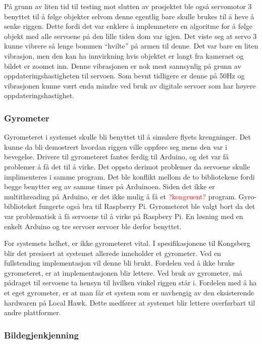 På grunn av liten tid til testing mot slutten av prosjektet ble også servomotor 3 benyttet til å følge objekter selvom denne egentlig bare skulle brukes til å heve å senke riggen. Dette fordi det var enklere å implemnetere en algoritme for å følge objekt med alle servoene på den lille tiden dom var igjen. Det viste seg at servo 3 kunne vibrere så lenge bommen ``hvilte'' på armen til denne. Det var bare en liten vibrasjon, men den kan ha innvirkning hvis objektet er langt fra kameraet og bildet er zoomet inn. Denne vibrasjonen er nok mest sannsynlig på grunn av oppdateringshastigheten til servoen. Som bevnt tidligere er denne på 50Hz og vibrasjonen kunne vært enda mindre ved bruk av digitale servoer som har høyere oppdateringshastighet.  
   

\subsubsection{Gyrometer}
Gyrometeret i systemet skulle bli benyttet til å simulere flyets krengninger. Det kunne da bli demostrert hvordan riggen ville oppføre seg mens den var i bevegelse. Drivere til gyrometeret fantes ferdig til Arduino, og det var få problemer å få det til å virke. Det oppsto derimot problemer da servoene skulle implimenteres i samme program. Det ble konflikt mellom de to bibliotekene fordi begge benytter seg av samme timer på Arduinoen. Siden det ikke er multithreading på Arduino, er det ikke mulig å få et \textcolor{red}{?kongruent?} program. Gyro-biblioteket fungerte også bra til Raspberry Pi. Gyrometeret ble valgt bort da det var problematisk å få servoene til å virke på Raspbery Pi. En løsning med en enkelt Arduino og tre servoer servoer ble derfor benyttet. 

For systemets helhet, er ikke gyrometeret vital. I spesifikasjonene til Kongsberg blir det presisert at systemet allerede inneholder et gyrometer. Ved en fullstending implementasjon vil denne bli brukt. Fordelen ved å ikke bruke gyrometeret, er at implementasjonen blir lettere. Ved bruk av gyrometer, må pådraget til servoene ta hensyn til hvilken vinkel riggen står i. Fordelen med å ha et eget gyrometer, er at man får et system som er uavhengig av den eksisterende hardwaren på Local Hawk. Dette medfører at systemet blir lettere overførbart til andre plattformer.

\subsubsection{Bildegjenkjenning}

